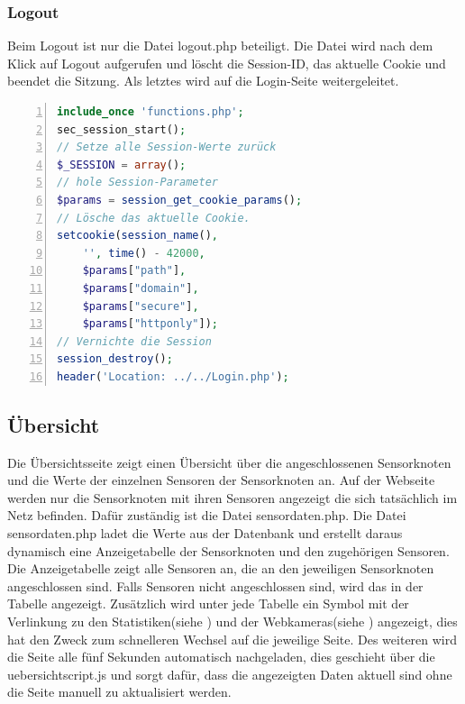 \subsubsection{Logout}
Beim Logout ist nur die Datei logout.php beteiligt. Die Datei wird nach dem Klick auf Logout aufgerufen und löscht die Session-ID, das aktuelle Cookie und beendet die Sitzung. Als letztes wird auf die Login-Seite weitergeleitet.

\begin{lstlisting}[caption=Inhalt der logout.php,frame=single,numbers=left,language=PHP]
include_once 'functions.php';
sec_session_start();
// Setze alle Session-Werte zurück
$_SESSION = array();
// hole Session-Parameter
$params = session_get_cookie_params();
// Lösche das aktuelle Cookie.
setcookie(session_name(),
    '', time() - 42000,
    $params["path"],
    $params["domain"],
    $params["secure"],
    $params["httponly"]);
// Vernichte die Session
session_destroy();
header('Location: ../../Login.php');
\end{lstlisting}

\subsection{Übersicht}\label{Uebersicht}
Die Übersichtsseite zeigt einen Übersicht über die angeschlossenen Sensorknoten und die Werte der einzelnen Sensoren der Sensorknoten an. Auf der Webseite werden nur die Sensorknoten mit ihren Sensoren angezeigt die sich tatsächlich im Netz befinden. Dafür zuständig ist die Datei sensordaten.php. Die Datei sensordaten.php ladet die Werte aus der Datenbank und erstellt daraus dynamisch eine Anzeigetabelle der Sensorknoten und den zugehörigen Sensoren. Die Anzeigetabelle zeigt alle Sensoren an, die an den jeweiligen Sensorknoten angeschlossen sind. Falls Sensoren nicht angeschlossen sind, wird das in der Tabelle angezeigt. Zusätzlich wird unter jede Tabelle ein Symbol mit der Verlinkung zu den Statistiken(siehe ) und der Webkameras(siehe ) angezeigt, dies hat den Zweck zum schnelleren Wechsel auf die jeweilige Seite. Des weiteren wird die Seite alle fünf Sekunden automatisch nachgeladen, dies geschieht über die uebersichtscript.js und sorgt dafür, dass die angezeigten Daten aktuell sind ohne die Seite manuell zu aktualisiert werden.

